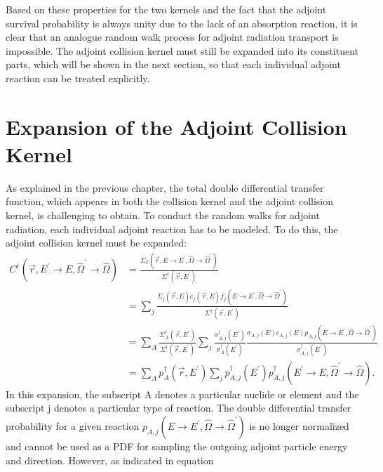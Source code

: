 Based on these properties for the two kernels and the fact that the adjoint
survival probability is always unity due to the lack of an absorption reaction,
it is clear that an analogue random walk process for adjoint radiation 
transport is impossible. The adjoint collision kernel must still be 
expanded into its constituent parts, which will be shown in the next section, 
so that each individual adjoint reaction can be treated explicitly. 

\section{Expansion of the Adjoint Collision Kernel}
As explained in the previous chapter, the total double differential transfer 
function, which appears in both the collision kernel and the adjoint collision 
kernel, is challenging to obtain. To conduct the random walks for adjoint 
radiation, each individual adjoint reaction has to be modeled. To do this, the 
adjoint collision kernel must be expanded:
\begin{align}
  C^{\dagger}(\vec{r},E^{'} \to E,\hat{\Omega}^{'} \to \hat{\Omega}) & =
  \frac{\Sigma_T(\vec{r},E \to E^{'},\hat{\Omega} \to \hat{\Omega}^{'})}
       {\Sigma^{\dagger}(\vec{r},E^{'})} \nonumber \\
       & = \sum_j 
       \frac{\Sigma_{j}(\vec{r},E)c_j(\vec{r},E)
         f_j(E \to E^{'},\hat{\Omega} \to \hat{\Omega}^{'})}
            {\Sigma^{\dagger}(\vec{r},E^{'})} \nonumber \\
  & = \sum_A \frac{\Sigma_A^{\dagger}(\vec{r},E^{'})}
                  {\Sigma^{\dagger}(\vec{r},E^{'})}
  \sum_j \frac{\sigma_{A,j}^{\dagger}(E^{'})}{\sigma_A^{\dagger}(E^{'})}
  \frac{\sigma_{A,j}(E) c_{A,j}(E) 
        p_{A,j}(E \to E^{'},\hat{\Omega} \to \hat{\Omega}^{'})}
       {\sigma_{A,j}^{\dagger}(E^{'})} \nonumber \\
  & = \sum_A p_A^{\dagger}(\vec{r},E^{'}) \sum_j p_{A,j}^{\dagger}(E^{'})
       p_{A,j}^{\dagger}(E^{'} \to E,\hat{\Omega}^{'} \to \hat{\Omega}).
  \label{eq:expanded_adj_collision_kernel}
\end{align}
In this expansion, the subscript A denotes a particular nuclide or element
and the subscript j denotes a particular type of reaction. The double 
differential transfer probability for a given reaction 
$p_{A,j}(E \to E^{'},\hat{\Omega} \to \hat{\Omega}^{'})$ is no longer normalized 
and cannot be used as a PDF for sampling the outgoing adjoint particle energy 
and direction. However, as indicated in equation 
